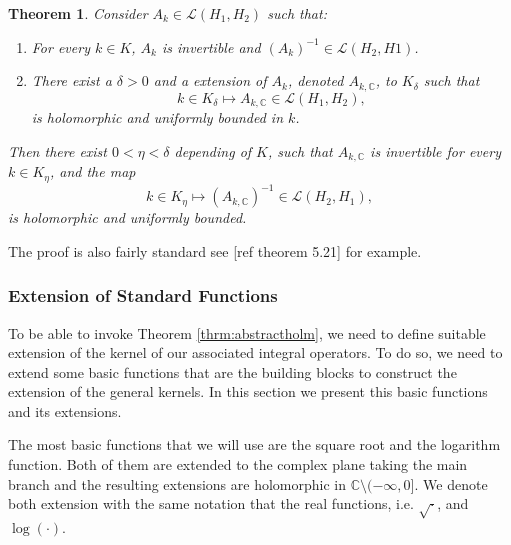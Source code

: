 \documentclass{article}
\newtheorem{theorem}{Theorem}[section]
\newcommand{\todo}[1]{{\color{red}[#1]}}
\newcommand{\IC}{{\mathbb C}}
\begin{document}
\begin{theorem}
\label{thrm:abtractinverse}
Consider $A_k \in \mathcal{L}(H_1,H_2)$ such that: 
\begin{enumerate}
\item 
For every $k \in K$, $A_k$ is invertible and $(A_k)^{-1} \in \mathcal{L}(H_2,H1)$. 
\item 
There exist a $\delta >0$ and a extension of $A_k$, denoted $A_{k,\IC}$, to $K_\delta$ such that 
$$k \in K_\delta \mapsto A_{k,\IC} \in \mathcal{L}(H_1,H_2),$$
 is holomorphic and uniformly bounded in $k$. 
\end{enumerate}
Then there exist $0<\eta<\delta$ depending of $K$, such that 
$A_{k,\IC}$ is invertible for every $k \in K_\eta$, and the map 
$$k \in K_\eta \mapsto (A_{k,\IC})^{-1} \in \mathcal{L}(H_2,H_1),$$ is holomorphic and uniformly bounded. 
\end{theorem} 

The proof is also fairly standard see \todo{ref theorem 5.21} for example. 

\subsubsection{Extension of Standard Functions}
\label{sec:ExtensionofFunctions}
To be able to invoke Theorem \ref{thrm:abstractholm}, we need to define suitable extension of the kernel of our associated integral operators. To do so, we need to extend some basic functions that are the building blocks to construct the extension of the general kernels. In this section we present this basic functions and its extensions. 

The most basic functions that we will use are the square root and the logarithm function. Both of them are extended to the complex plane taking the main branch and the resulting extensions are holomorphic in $\IC \setminus (-\infty,0]$. We denote both extension with the same notation that the real functions, i.e. $\sqrt{\cdot}$, and $\log{(\cdot)}$.   
\end{document}
